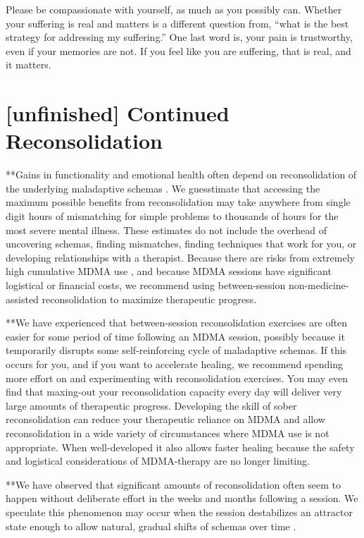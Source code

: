 \documentclass[12pt,letterpaper]{book}
\begin{document}
Please be compassionate with yourself, as much as you possibly can. Whether your suffering is real and matters is a different question from, “what is the best strategy for addressing my suffering.” One last word is, your pain is trustworthy, even if your memories are not. If you feel like you are suffering, that is real, and it matters.
\section{[unfinished] Continued Reconsolidation}
\label{sec:moreReconsolidation}
**Gains in functionality and emotional health often depend on reconsolidation of the underlying maladaptive schemas \cite{eckerUnlocking}. We guesstimate that accessing the maximum possible benefits from reconsolidation may take anywhere from single digit hours of mismatching for simple problems to thousands of hours for the most severe mental illness. These estimates do not include the overhead of uncovering schemas, finding mismatches, finding techniques that work for you, or developing relationships with a therapist. Because there are risks from extremely high cumulative MDMA use \cite{tagen2023valvular}, and because MDMA sessions have significant logistical or financial costs, we recommend using between-session non-medicine-assisted reconsolidation to maximize therapeutic progress.

**We have experienced that between-session reconsolidation exercises are often easier for some period of time following an MDMA session, possibly because it temporarily disrupts some self-reinforcing cycle of maladaptive schemas. If this occurs for you, and if you want to accelerate healing, we recommend spending more effort on and experimenting with reconsolidation exercises. You may even find that maxing-out your reconsolidation capacity every day will deliver very large amounts of therapeutic progress. Developing the skill of sober reconsolidation can reduce your therapeutic reliance on MDMA and allow reconsolidation in a wide variety of circumstances where MDMA use is not appropriate. When well-developed it also allows faster healing because the safety and logistical considerations of MDMA-therapy are no longer limiting.

**We have observed that significant amounts of reconsolidation often seem to happen without deliberate effort in the weeks and months following a session. We speculate this phenomenon may occur when the session destabilizes an attractor state enough to allow natural, gradual shifts of schemas over time \cite{hayes2020complex}.
\end{document}
